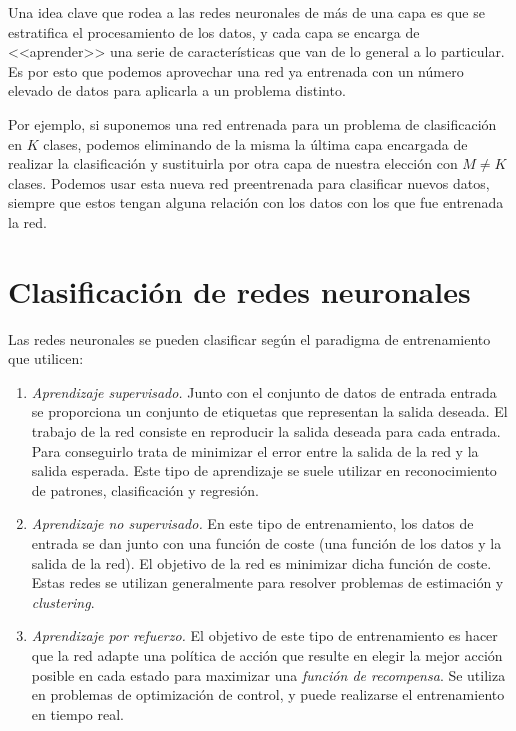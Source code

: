 \documentclass[
  a4paper,
  12pt,
  spanish,
]{scrartcl}
\theoremstyle{teorema-style}
\begin{document}
Una idea clave que rodea a las redes neuronales de más de una capa es que se estratifica el procesamiento de los datos, y cada capa se encarga de <<aprender>> una serie de características que van de lo general a lo particular. Es por esto que podemos aprovechar una red ya entrenada con un número elevado de datos para aplicarla a un problema distinto.

Por ejemplo, si suponemos una red entrenada para un problema de clasificación en $K$ clases, podemos eliminando de la misma la última capa encargada de realizar la clasificación y sustituirla por otra capa de nuestra elección con $M \neq K$ clases. Podemos usar esta nueva red preentrenada para clasificar nuevos datos, siempre que estos tengan alguna relación con los datos con los que fue entrenada la red.

\section{Clasificación de redes neuronales}
\label{sec:clasificacion}

Las redes neuronales se pueden clasificar según el paradigma de entrenamiento que utilicen:

\begin{enumerate}
\item \textit{Aprendizaje supervisado. } Junto con el conjunto de datos de entrada entrada se proporciona un conjunto de etiquetas que representan la salida deseada. El trabajo de la red consiste en reproducir la salida deseada para cada entrada. Para conseguirlo trata de minimizar el error entre la salida de la red y la salida esperada. Este tipo de aprendizaje se suele utilizar en reconocimiento de patrones, clasificación y regresión.
\item \textit{Aprendizaje no supervisado. } En este tipo de entrenamiento, los
  datos de entrada se dan junto con una función de coste (una función de los
  datos y la salida de la red). El objetivo de la red es minimizar dicha función
  de coste. Estas redes se utilizan generalmente para resolver problemas de
  estimación y \textit{clustering}.
\item \textit{Aprendizaje por refuerzo. } El objetivo de este tipo de
  entrenamiento es hacer que la red adapte una política de acción que resulte en elegir la mejor acción posible en cada estado para maximizar una \textit{función de recompensa}. Se utiliza en problemas de optimización de control, y puede realizarse el entrenamiento en tiempo real.
\end{enumerate}
\end{document}
